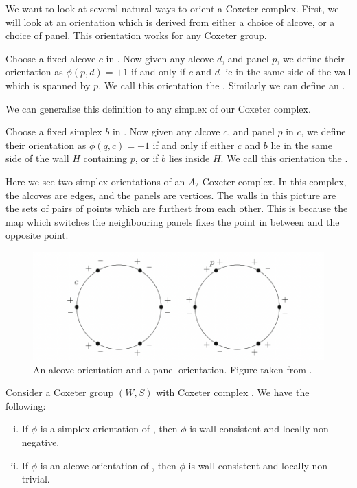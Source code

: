 \documentclass[11pt]{article}
\begin{document}
We want to look at several natural ways to orient a Coxeter complex. First, we will look at an orientation which is derived from either a choice of alcove, or a choice of panel. This orientation works for any Coxeter group.

\begin{definition}
    Choose a fixed alcove $c$ in \sg. Now given any alcove $d$, and panel $p$, we define their orientation as $\phi(p,d)=+1$ if and only if $c$ and $d$ lie in the same side of the wall which is spanned by $p$. We call this orientation the . Similarly we can define an .
\end{definition}

We can generalise this definition to any simplex of our Coxeter complex. 

\begin{definition}
    Choose a fixed simplex $b$ in \sg. Now given any alcove $c$, and panel $p$ in $c$, we define their orientation as $\phi(q,c)=+1$ if and only if either $c$ and $b$ lie in the same side of the wall $H$ containing $p$, or if $b$ lies inside $H$. We call this orientation the .
\end{definition}
\begin{example}
    Here we see two simplex orientations of an $A_2$ Coxeter complex. In this complex, the alcoves are edges, and the panels are vertices. The walls in this picture are the sets of pairs of points which are furthest from each other. This is because the map which switches the neighbouring panels fixes the point in between and the opposite point. 
\end{example}
\begin{figure}
    \begin{center}
    \includegraphics[scale=0.5]{Screenshot 2023-04-18 at 14.56.40.png}
    \end{center}
    \caption{An alcove orientation and a panel orientation. Figure taken from \cite[p.124]{SHA}.}
\end{figure}
\begin{lemma}
    Consider a Coxeter group $(W,S)$ with Coxeter complex \sg. We have the following:
    \begin{enumerate}[(i)]
        \item If $\phi$ is a simplex orientation of \sg, then $\phi$ is wall consistent and locally non-negative.
        \item If $\phi$ is an alcove orientation of \sg, then $\phi$ is wall consistent and locally non-trivial.
    \end{enumerate}
\end{lemma}
\end{document}
